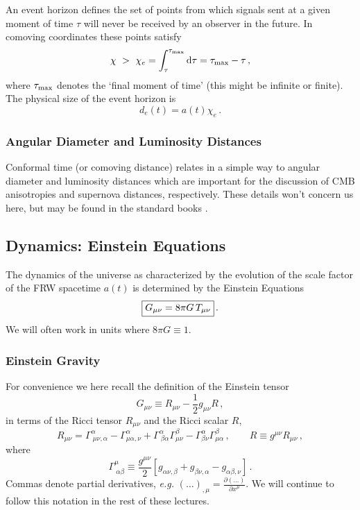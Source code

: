 \documentclass[12pt,letterpaper,rotate]{article}
\def\beq{\begin{equation}}
\def\eeq{\end{equation}}
\def\d{{\rm d}}
\begin{document}
{An event horizon defines the set of points from which signals sent at a given moment of time $\tau$ will never be received by an observer in the future.
In comoving coordinates these points satisfy
\beq
\chi \ >\  \chi_e = \int_\tau^{\tau_{\rm max}} \d \tau = \tau_{\rm max} - \tau\, ,
\eeq
where $\tau_{\rm max}$ denotes the `final moment of time' (this might be infinite or finite).
The physical size of the event horizon is 
\beq
d_e(t) = a(t) \chi_e\, .
\eeq

\subsubsection*{Angular Diameter and Luminosity Distances}

Conformal time (or comoving distance) relates in a simple way to angular diameter and luminosity distances which are important for the discussion of CMB anisotropies and supernova distances, respectively.
These details won't concern us here, but may be found in the standard books \cite{Dodelson, Mukhanov, WeinbergCosmology}.



\subsection{Dynamics: Einstein Equations}
\label{sec:EinsteinEqns}

The dynamics of the universe as characterized by the evolution of the scale factor of the FRW spacetime $a(t)$ is determined by the Einstein Equations
\beq
\label{equ:Einstein}
\fbox{$\displaystyle
G_{\mu \nu} =8\pi G\, T_{\mu \nu} $}\, .
\eeq
We will often work in units where $8\pi G \equiv 1$.

\subsubsection*{Einstein Gravity}

For convenience we here recall the definition of the Einstein tensor
\beq
G_{\mu \nu} \equiv R_{\mu \nu} - \frac{1}{2} g_{\mu \nu} R\, ,
\eeq
in terms of the Ricci tensor $R_{\mu \nu}$ and the Ricci scalar $R$,
\beq
R_{\mu \nu} = \Gamma^\alpha_{\ \mu \nu, \alpha} - \Gamma^\alpha_{\mu \alpha, \nu} + \Gamma^\alpha_{\ \beta \alpha} \Gamma^\beta_{\mu \nu} - \Gamma^\alpha_{\beta \nu} \Gamma^\beta_{\mu \alpha}\, , \qquad  R \equiv g^{\mu \nu} R_{\mu \nu}\, ,
\eeq
where
\beq
\Gamma^\mu_{\ \alpha \beta} \equiv \frac{g^{\mu \nu}}{2} \left[ g_{\alpha \nu , \beta} + g_{\beta \nu , \alpha} - g_{\alpha \beta, \nu}\right]\, .
\eeq
Commas denote partial derivatives, {\it e.g.} $(\dots)_{,\mu} =\frac{\partial (\dots)}{\partial x^\mu}$. We will continue to follow this notation in the rest of these lectures.

}
\end{document}
